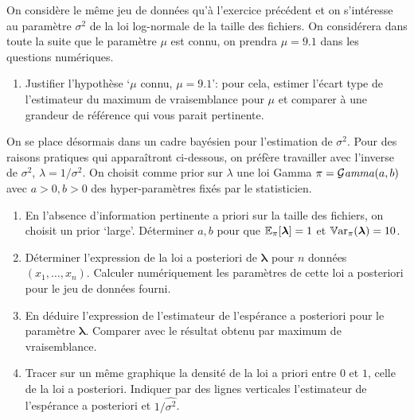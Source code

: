 \documentclass[11pt,a4paper,oneside]{article}
\newcommand{\blambda}{\boldsymbol{\lambda}}
\begin{document}
\begin{exercice}
  On considère le même jeu de données qu'à l'exercice précédent et on s'intéresse au paramètre $\sigma^2$ de la loi log-normale de la taille des fichiers. On considérera dans toute la suite que le paramètre $\mu$ est connu, on prendra $\mu = 9.1$ dans les questions numériques.
  \begin{enumerate}
  \item Justifier l'hypothèse `$\mu$ connu, $\mu = 9.1$': pour cela, estimer l'écart type de l'estimateur du maximum de vraisemblance pour $\mu$ et comparer à une grandeur de référence qui vous parait pertinente. %
  \end{enumerate}
   On se place désormais dans un cadre bayésien  pour l'estimation de $\sigma^2$.
   Pour des raisons pratiques qui apparaîtront ci-dessous, on préfère travailler avec l'inverse de $\sigma^2$, $\lambda = 1/\sigma^2$. On choisit comme prior sur $\lambda$ une loi Gamma $\pi = \mathcal{G}\mathit{amma}(a,b)$ avec $a>0, b>0$ des hyper-paramètres fixés par le statisticien. 
\begin{enumerate}[resume]%
\item En l'absence d'information pertinente a priori sur la taille des
  fichiers, on choisit un prior `large'. Déterminer $a,b$ pour que
  $\esp_{\pi}[\blambda] = 1$ et $\Var_\pi(\blambda) = 10$.
\item Déterminer l'expression de la loi a posteriori de $\blambda$ pour $n$ données
  $(x_1,\ldots,x_n)$.  Calculer numériquement  les paramètres
  de cette loi a posteriori pour le jeu de données fourni.
\item En déduire l'expression de l'estimateur de l'espérance a
  posteriori pour le paramètre $\blambda$. Comparer avec le résultat
  obtenu par maximum de vraisemblance.

\item Tracer sur un même graphique la densité de la loi a priori entre $0$ et $1$, celle de la loi a posteriori. Indiquer par des lignes verticales l'estimateur de l'espérance a posteriori et $1/\hat{\sigma^2}$.
  

\end{enumerate}
\end{exercice}
\end{document}
